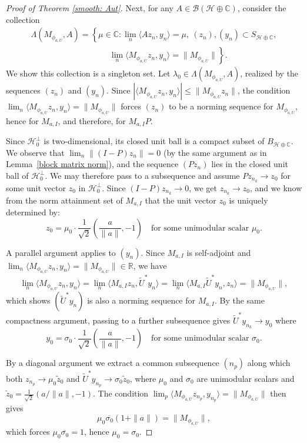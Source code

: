 \documentclass[10pt,a4paper]{amsart}
\renewcommand{\H}{\mathcal{H}}
\begin{document}
\begin{proof}[Proof of Theorem \ref{smooth: Aut}]
\medskip

Next, for any $A \in \mathcal{B}(\mathcal{H} \oplus \mathbb{C})$, consider the 
collection 
\begin{multline*}
\Lambda(M_{\phi_{a,U}}, A) = \left\{\mu \in \mathbb{C} : 
\lim_n \langle Az_n, y_n\rangle = \mu,\ 
(z_n),(y_n) \subset S_{\mathcal{H}\oplus\mathbb{C}},\right.\\
\left.\hspace{4cm} \lim_n \langle M_{\phi_{a,U}}z_n, y_n\rangle 
= \|M_{\phi_{a,U}}\|\right\}.
\end{multline*}
We show this collection is a singleton set. Let $\lambda_0 \in 
\Lambda(M_{\phi_{a,U}}, A)$, realized by the sequences $(z_n)$ and $(y_n)$. 
Since $|\langle M_{\phi_{a,U}}z_n, y_n\rangle| \leq \|M_{\phi_{a,U}}z_n\|$, the 
condition $\lim_n\langle M_{\phi_{a,U}}z_n, y_n\rangle = \|M_{\phi_{a,U}}\|$ 
forces $(z_n)$ to be a norming sequence for $M_{\phi_{a,U}}$, hence for 
$M_{a,I}$, and therefore, for $M_{a,I}P$.

\medskip

\noindent Since $\mathcal{H}_0^\perp$ is 
two-dimensional, its closed unit ball is a compact subset of $B_{\H\oplus \mathbb{C}}$. We observe that 
$\lim_n\|(I-P)z_n\| = 0$ (by the same argument as in 
Lemma~\ref{block matrix norm}), and the sequence $(Pz_n)$ lies in the closed unit ball of $\mathcal{H}_0^\perp$. We may therefore pass to a 
subsequence and assume $Pz_{n_k} \to z_0$ for some unit vector $z_0$ in $\mathcal{H}_0^\perp$. Since $(I-P)z_{n_k} \to 0$, we get 
$z_{n_k} \to z_0$, and we know from the norm attainment set of $M_{a,I}$ that the unit vector $z_0$ is uniquely determined by:
\[
z_0 = \mu_0\cdot\frac{1}{\sqrt{2}}\left(\frac{a}{\|a\|}, -1\right)
\quad\text{for some unimodular scalar } \mu_0.
\]

\noindent A parallel argument applies to $(y_n)$. Since $M_{a,I}$ 
is self-adjoint and $\lim_n\langle M_{\phi_{a,U}}z_n, y_n\rangle = 
\|M_{\phi_{a,U}}\| \in \mathbb{R}$, we have
\[
\lim_n\langle M_{\phi_{a,U}}z_n, y_n\rangle 
= \lim_n\langle M_{a,I}z_n, \widetilde{U}^*y_n\rangle 
= \lim_n\langle M_{a,I}\widetilde{U}^*y_n, z_n\rangle 
= \|M_{\phi_{a,U}}\|,
\]
which shows $(\widetilde{U}^*y_n)$ is also a norming sequence for 
$M_{a,I}$. By the same compactness argument, passing to a further 
subsequence gives $\widetilde{U}^*y_{n_k} \to y_0$ where
\[
y_0 = \sigma_0\cdot\frac{1}{\sqrt{2}}\left(\frac{a}{\|a\|}, -1\right)
\quad\text{for some unimodular scalar } \sigma_0.
\]

\noindent By a diagonal argument we extract a common subsequence 
$(n_p)$ along which both $z_{n_p} \to \mu_0\tilde{z}_0$ and 
$\widetilde{U}^*y_{n_p} \to \sigma_0\tilde{z}_0$, where $\mu_0$ and $\sigma_0$ are unimodular scalars and $\tilde{z}_0 = \frac{1}{\sqrt{2}}\left(a/\|a\|, -1\right)$. 
The condition $\lim_p\langle M_{\phi_{a,U}}z_{n_p}, y_{n_p}\rangle = 
\|M_{\phi_{a,U}}\|$ then gives
\[
\mu_0\overline{\sigma_0}(1 + \|a\|) = \|M_{\phi_{a,U}}\|,
\]
which forces $\mu_0\overline{\sigma_0} = 1$, hence $\mu_0 = \sigma_0$.


\end{proof}
\end{document}
